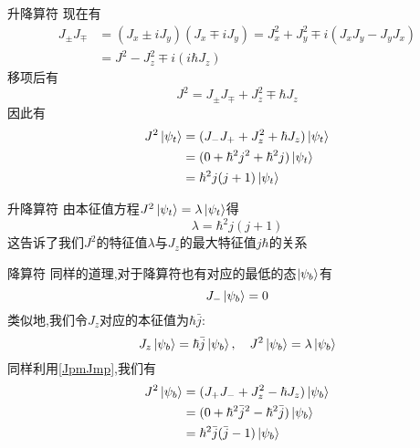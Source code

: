 \documentclass{beamer}
\begin{document}
\begin{frame}{升降算符}
现在有
\begin{equation}
\begin{split}\label{JpmJmp}
J_\pm J_\mp &= (J_x \pm i J_y)(J_x \mp i J_y) = J_x^2 + J_y^2 \mp i (J_x J_y - J_y J_x) \\
 &= J^2 - J_z^2 \mp i (i\hbar J_z)
\end{split}
\end{equation}
移项后有
\begin{equation}
J^2 = J_\pm J_\mp + J_z^2 \mp \hbar J_z
\end{equation}
因此有
\begin{equation}
\begin{split}
J^2 \ket{\psi_t} &= (J_- J_+ + J_z^2 + \hbar J_z) \ket{\psi_t} \\
 &= (0 + \hbar^2 j^2 + \hbar^2 j) \ket{\psi_t} \\
 &= \hbar^2 j(j + 1) \ket{\psi_t}
\end{split}
\end{equation}
\end{frame}

\begin{frame}{升降算符}
由本征值方程$J^2 \ket{\psi_t} = \lambda \ket{\psi_t}$得
\begin{equation}
\lambda = \hbar^2 j(j + 1)
\end{equation}
这告诉了我们$J^2$的特征值$\lambda$与$J_z$的最大特征值$j\hbar$的关系
\end{frame}

\begin{frame}{降算符}
同样的道理,对于降算符也有对应的最低的态$\ket{\psi_b}$有
\begin{equation}
J_- \ket{\psi_b} = 0
\end{equation}
类似地,我们令$J_z$对应的本征值为$\hbar \bar{j}$:
\begin{equation}
J_z \ket{\psi_b} = \hbar \bar{j} \ket{\psi_b}, \quad J^2 \ket{\psi_b} = \lambda \ket{\psi_b}
\end{equation}
同样利用\eqref{JpmJmp},我们有
\begin{equation}
\begin{split}
J^2 \ket{\psi_b} &= (J_+ J_- + J_z^2 - \hbar J_z) \ket{\psi_b} \\
 &= (0 + \hbar^2 \bar{j}^2 - \hbar^2 \bar{j}) \ket{\psi_b} \\
 &= \hbar^2 \bar{j}(\bar{j} - 1) \ket{\psi_b}
\end{split}
\end{equation}
\end{frame}
\end{document}
